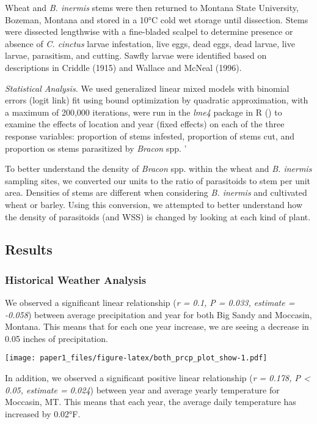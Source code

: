 \documentclass[
]{article}
\begin{document}
Wheat and \emph{B. inermis} stems were then returned to Montana State
University, Bozeman, Montana and stored in a 10°C cold wet storage until
dissection. Stems were dissected lengthwise with a fine-bladed scalpel
to determine presence or absence of \emph{C. cinctus} larvae
infestation, live eggs, dead eggs, dead larvae, live larvae, parasitism,
and cutting. Sawfly larvae were identified based on descriptions in
Criddle (1915) and Wallace and McNeal (1996).

\emph{Statistical Analysis.} We used generalized linear mixed models
with binomial errors (logit link) fit using bound optimization by
quadratic approximation, with a maximum of 200,000 iterations, were run
in the \emph{lme4} package in R () to examine the effects of location and year
(fixed effects) on each of the three response variables: proportion of
stems infested, proportion of stems cut, and proportion os stems
parasitized by \emph{Bracon} spp. '

To better understand the density of \emph{Bracon} spp. within the wheat
and \emph{B. inermis} sampling sites, we converted our units to the
ratio of parasitoids to stem per unit area. Densities of stems are
different when considering \emph{B. inermis} and cultivated wheat or
barley. Using this conversion, we attempted to better understand how the
density of parasitoids (and WSS) is changed by looking at each kind of
plant.

\subsection{Results}\label{results}

\subsubsection{Historical Weather
Analysis}\label{historical-weather-analysis}

We observed a significant linear relationship (\emph{r = 0.1, P = 0.033,
estimate = -0.058}) between average precipitation and year for both Big
Sandy and Moccasin, Montana. This means that for each one year increase,
we are seeing a decrease in 0.05 inches of precipitation.

\texttt{[image: paper1\_files/figure-latex/both\_prcp\_plot\_show-1.pdf]}

In addition, we observed a significant positive linear relationship
(\emph{r = 0.178, P \textless{} 0.05, estimate = 0.024}) between year
and average yearly temperature for Moccasin, MT. This means that each
year, the average daily temperature has increased by 0.02°F.
\end{document}
